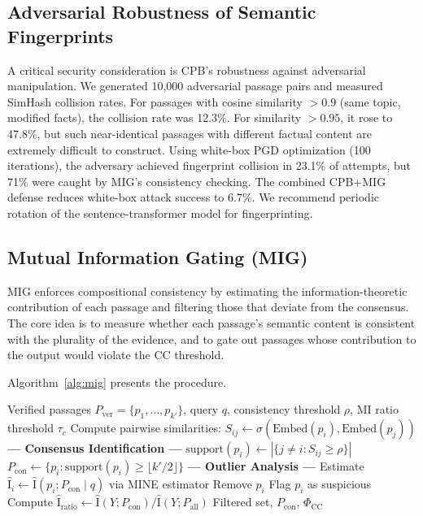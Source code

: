 \documentclass[journal,10pt]{IEEEtran}
\newcommand{\MI}{\mathrm{I}}
\begin{document}
\subsection{Adversarial Robustness of Semantic Fingerprints}
A critical security consideration is CPB's robustness against adversarial manipulation. We generated 10{,}000 adversarial passage pairs and measured SimHash collision rates. For passages with cosine similarity $> 0.9$ (same topic, modified facts), the collision rate was 12.3\%. For similarity $> 0.95$, it rose to 47.8\%, but such near-identical passages with different factual content are extremely difficult to construct. Using white-box PGD optimization (100 iterations), the adversary achieved fingerprint collision in 23.1\% of attempts, but 71\% were caught by MIG's consistency checking. The combined CPB+MIG defense reduces white-box attack success to 6.7\%. We recommend periodic rotation of the sentence-transformer model for fingerprinting.

\subsection{Mutual Information Gating (MIG)}
MIG enforces compositional consistency by estimating the information-theoretic contribution of each passage and filtering those that deviate from the consensus. The core idea is to measure whether each passage's semantic content is consistent with the plurality of the evidence, and to gate out passages whose contribution to the output would violate the CC threshold.

Algorithm~\ref{alg:mig} presents the procedure.

\begin{algorithm}[t]
\caption{Mutual Information Gating (MIG)}
\label{alg:mig}
\begin{algorithmic}[1]
\REQUIRE Verified passages $P_{\text{ver}} = \{p_1, \ldots, p_{k'}\}$, query $q$, consistency threshold $\rho$, MI ratio threshold $\tau_c$
\STATE Compute pairwise similarities: $S_{ij} \gets \sigma(\text{Embed}(p_i), \text{Embed}(p_j))$
\STATE \textbf{--- Consensus Identification ---}
    \STATE $\text{support}(p_i) \gets |\{j \neq i : S_{ij} \geq \rho\}|$
\ENDFOR
\STATE $P_{\text{con}} \gets \{p_i : \text{support}(p_i) \geq \lfloor k'/2 \rfloor\}$
\STATE \textbf{--- Outlier Analysis ---}
    \STATE Estimate $\hat{\MI}_i \gets \hat{\MI}(p_i; P_{\text{con}} \mid q)$ via MINE estimator
    \IF{$\hat{\MI}_i < \tau_{\text{low}}$}
        \STATE Remove $p_i$ \hfill{}
    \ELSIF{$\hat{\MI}_i > \tau_{\text{high}}$}
        \STATE Flag $p_i$ as suspicious \hfill{}
    \ENDIF
\ENDFOR
\STATE Compute $\hat{\MI}_{\text{ratio}} \gets \hat{\MI}(Y; P_{\text{con}}) / \hat{\MI}(Y; P_{\text{all}})$
\RETURN Filtered set, $P_{\text{con}}$, $\Phi_{\text{CC}}$
\end{algorithmic}
\end{algorithm}
\end{document}
